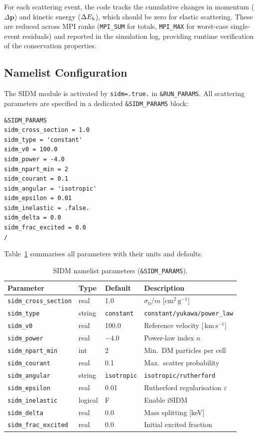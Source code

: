 \documentclass[fleqn,usenatbib]{mnras}
\newcommand{\code}[1]{\texttt{#1}}
\newcommand{\kms}{\,\mathrm{km\,s^{-1}}}
\begin{document}
For each scattering event, the code tracks the cumulative changes in
momentum ($\Delta\mathbf{p}$) and kinetic energy ($\Delta E_{\rm k}$),
which should be zero for elastic scattering.  These are reduced across
MPI ranks (\code{MPI\_SUM} for totals, \code{MPI\_MAX} for
worst-case single-event residuals) and reported in the simulation log,
providing runtime verification of the conservation properties.

\subsection{Namelist Configuration}
\label{sec:sidm_namelist}

The SIDM module is activated by \code{sidm=.true.} in
\code{\&RUN\_PARAMS}.  All scattering parameters are specified in a
dedicated \code{\&SIDM\_PARAMS} block:
\begin{verbatim}
&SIDM_PARAMS
sidm_cross_section = 1.0
sidm_type = 'constant'
sidm_v0 = 100.0
sidm_power = -4.0
sidm_npart_min = 2
sidm_courant = 0.1
sidm_angular = 'isotropic'
sidm_epsilon = 0.01
sidm_inelastic = .false.
sidm_delta = 0.0
sidm_frac_excited = 0.0
/
\end{verbatim}
Table~\ref{tab:sidm_params} summarises all parameters with their
units and defaults.

\begin{table}
\centering
\caption{SIDM namelist parameters (\code{\&SIDM\_PARAMS}).}
\label{tab:sidm_params}
\small
\begin{tabular}{llll}
\toprule
Parameter & Type & Default & Description \\
\midrule
\code{sidm\_cross\_section} & real & 1.0 & $\sigma_0/m$ [$\mathrm{cm^2\,g^{-1}}$] \\
\code{sidm\_type} & string & \code{constant} & \code{constant/yukawa/power\_law} \\
\code{sidm\_v0} & real & 100.0 & Reference velocity [$\kms$] \\
\code{sidm\_power} & real & $-4.0$ & Power-law index $n$ \\
\code{sidm\_npart\_min} & int & 2 & Min.\ DM particles per cell \\
\code{sidm\_courant} & real & 0.1 & Max.\ scatter probability \\
\code{sidm\_angular} & string & \code{isotropic} & \code{isotropic/rutherford} \\
\code{sidm\_epsilon} & real & 0.01 & Rutherford regularisation $\varepsilon$ \\
\code{sidm\_inelastic} & logical & F & Enable iSIDM \\
\code{sidm\_delta} & real & 0.0 & Mass splitting [keV] \\
\code{sidm\_frac\_excited} & real & 0.0 & Initial excited fraction \\
\bottomrule
\end{tabular}
\end{table}
\end{document}
